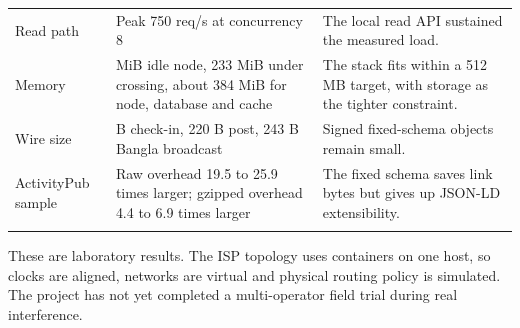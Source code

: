 \documentclass[12pt,a4paper]{article}
\begin{document}
\begin{small}
\begin{longtable}{@{}>{\raggedright\arraybackslash}p{}>{\raggedright\arraybackslash}p{}>{\raggedright\arraybackslash}p{}@{}}
\addlinespace[2pt]
Read path & Peak 750 req/s at concurrency 8 & The local read API sustained the measured load. \\
\addlinespace[2pt]
Memory & 62 MiB idle node, 233 MiB under crossing, about 384 MiB for node, database and cache & The stack fits within a 512 MB target, with storage as the tighter constraint. \\
\addlinespace[2pt]
Wire size & 155 B check-in, 220 B post, 243 B Bangla broadcast & Signed fixed-schema objects remain small. \\
\addlinespace[2pt]
ActivityPub sample & Raw overhead 19.5 to 25.9 times larger; gzipped overhead 4.4 to 6.9 times larger & The fixed schema saves link bytes but gives up JSON-LD extensibility. \\
\addlinespace[2pt]
\end{longtable}
\end{small}
These are laboratory results. The ISP topology uses containers on one host, so clocks are aligned, networks are virtual and physical routing policy is simulated. The project has not yet completed a multi-operator field trial during real interference.
\end{document}
